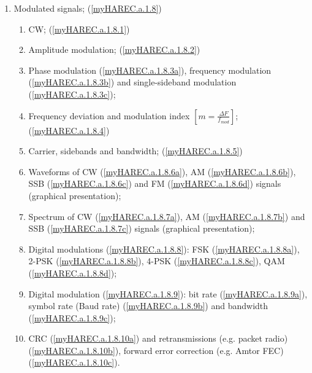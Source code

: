 \begin{enumerate}
\begin{enumerate}[noitemsep]
\item Modulated signals; (\ref{myHAREC.a.1.8})\label{HAREC.a.1.8}
\begin{enumerate}[noitemsep]
\item CW; (\ref{myHAREC.a.1.8.1})\label{HAREC.a.1.8.1}
\item Amplitude modulation; (\ref{myHAREC.a.1.8.2})\label{HAREC.a.1.8.2}
\item Phase modulation (\ref{myHAREC.a.1.8.3a})\label{HAREC.a.1.8.3a}, frequency modulation (\ref{myHAREC.a.1.8.3b})\label{HAREC.a.1.8.3b} and single-sideband modulation (\ref{myHAREC.a.1.8.3c})\label{HAREC.a.1.8.3c};
\item Frequency deviation and modulation index \(\left[m = \frac{\Delta F}{f_{mod}}\right]\); (\ref{myHAREC.a.1.8.4})\label{HAREC.a.1.8.4}
\item Carrier, sidebands and bandwidth; (\ref{myHAREC.a.1.8.5})\label{HAREC.a.1.8.5}
\item Waveforms of CW (\ref{myHAREC.a.1.8.6a})\label{HAREC.a.1.8.6a}, AM (\ref{myHAREC.a.1.8.6b})\label{HAREC.a.1.8.6b}, SSB (\ref{myHAREC.a.1.8.6c})\label{HAREC.a.1.8.6c} and FM (\ref{myHAREC.a.1.8.6d})\label{HAREC.a.1.8.6d} signals (graphical presentation);
\item Spectrum of CW (\ref{myHAREC.a.1.8.7a})\label{HAREC.a.1.8.7a}, AM (\ref{myHAREC.a.1.8.7b})\label{HAREC.a.1.8.7b} and SSB (\ref{myHAREC.a.1.8.7c})\label{HAREC.a.1.8.7c} signals (graphical presentation);
\item Digital modulations (\ref{myHAREC.a.1.8.8})\label{HAREC.a.1.8.8}: FSK (\ref{myHAREC.a.1.8.8a})\label{HAREC.a.1.8.8a}, 2-PSK (\ref{myHAREC.a.1.8.8b})\label{HAREC.a.1.8.8b}, 4-PSK (\ref{myHAREC.a.1.8.8c})\label{HAREC.a.1.8.8c}, QAM (\ref{myHAREC.a.1.8.8d})\label{HAREC.a.1.8.8d};
\item Digital modulation (\ref{myHAREC.a.1.8.9})\label{HAREC.a.1.8.9}: bit rate (\ref{myHAREC.a.1.8.9a})\label{HAREC.a.1.8.9a}, symbol rate (Baud rate) (\ref{myHAREC.a.1.8.9b})\label{HAREC.a.1.8.9b} and bandwidth (\ref{myHAREC.a.1.8.9c})\label{HAREC.a.1.8.9c};
\item CRC (\ref{myHAREC.a.1.8.10a})\label{HAREC.a.1.8.10a} and retransmissions (e.g. packet radio) (\ref{myHAREC.a.1.8.10b})\label{HAREC.a.1.8.10b}, forward error correction (e.g. Amtor FEC) (\ref{myHAREC.a.1.8.10c})\label{HAREC.a.1.8.10c}.
\end{enumerate}


\end{enumerate}
\end{enumerate}
